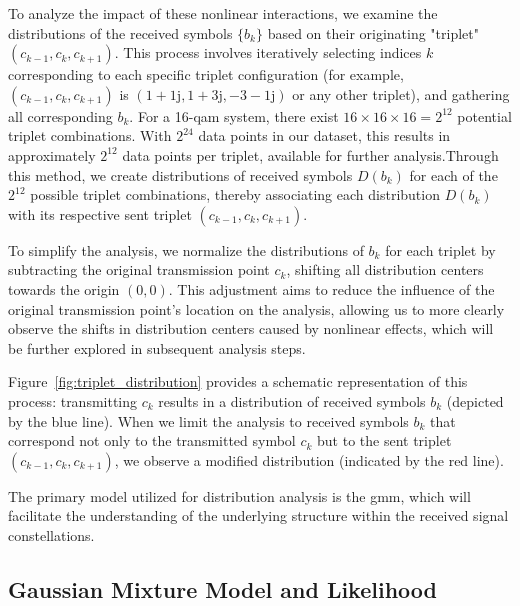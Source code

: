 To analyze the impact of these nonlinear interactions, we examine the distributions of the received symbols $\{b_k\}$ based on their originating "triplet" $(c_{k-1}, c_k, c_{k+1})$. This process involves iteratively selecting indices $k$ corresponding to each specific triplet configuration (for example, $(c_{k-1}, c_k, c_{k+1})$ is $(1+1\mathrm{j}, 1+3\mathrm{j}, -3-1\mathrm{j})$ or any other triplet), and gathering all corresponding $b_k$. 
For a 16-\Gls{qam} system, there exist \(16 \times 16 \times 16 = 2^{12}\) potential triplet combinations. With \(2^{24}\) data points in our dataset, this results in approximately \(2^{12}\) data points per triplet, available for further analysis.Through this method, we create distributions of received symbols $D(b_{k})$ for each of the $2^{12}$ possible triplet combinations, thereby associating each distribution $D(b_{k})$ with its respective sent triplet $(c_{k-1}, c_k, c_{k+1})$.

To simplify the analysis, we normalize the distributions of $b_k$ for each triplet by subtracting the original transmission point $c_k$, shifting all distribution centers towards the origin $(0, 0)$. This adjustment aims to reduce the influence of the original transmission point's location on the analysis, allowing us to more clearly observe the shifts in distribution centers caused by nonlinear effects, which will be further explored in subsequent analysis steps.

Figure~\ref{fig:triplet_distribution} provides a schematic representation of this process: transmitting $c_k$ results in a distribution of received symbols $b_k$ (depicted by the blue line). When we limit the analysis to received symbols $b_k$ that correspond not only to the transmitted symbol $c_k$ but to the sent triplet $(c_{k-1}, c_k, c_{k+1})$, we observe a modified distribution (indicated by the red line).


The primary model utilized for distribution analysis is the \Gls{gmm}, which will facilitate the understanding of the underlying structure within the received signal constellations.

\subsection{Gaussian Mixture Model and Likelihood}

